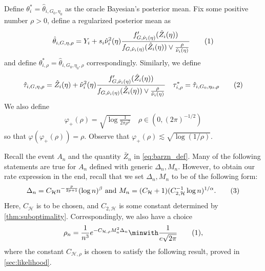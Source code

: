 \documentclass[12pt, reqno]{amsart}
\newcommand\numberthis{\addtocounter{equation}{1}\tag{\theequation}}
\newcommand{\invphi}{\varphi_{+}}
\newcommand{\Hyperparams}{\mathcal{H}}
\numberwithin{equation}{section}
\begin{document}
\begin{refsection}
\begin{appendices}
Define $\theta_i^* = \hat \theta_{i, G_0, \eta_0}$ as the oracle Bayesian's posterior
 mean. Fix some positive number $\rho > 0$, define a regularized posterior mean as \[
\hat\theta_{i, G, \eta, \rho} = Y_i + s_i \hat\nu_i^2(\eta) \frac{ f'_
{G, \hat\nu_i(\eta)}(\hat Z_i(\eta))}{f_
{G, \hat\nu_i(\eta)}(\hat Z_i(\eta)) \vee \frac{\rho}{\hat\nu_i(\eta)}} \numberthis
\label{eq:regularized_posterior_means}
\]
and define $\theta^*_{i, \rho} = \hat \theta_{i, G_0, \eta_0, \rho}$ correspondingly.
Similarly, we define \[
\hat\tau_{i, G, \eta, \rho} = \hat Z_i(\eta) + \hat\nu_i^2(\eta) \frac{ f'_
{G, \hat\nu_i(\eta)}(\hat Z_i(\eta))}{f_
{G, \hat\nu_i(\eta)}(\hat Z_i(\eta)) \vee \frac{\rho}{\hat\nu_i(\eta)}} \quad \tau^*_
{i, \rho} = \hat\tau_{i, G_0, \eta_0, \rho} \numberthis \label{eq:regularized_tau}
\]
We also define \begin{align}
\invphi(\rho) = \sqrt{\log \frac{1}{2\pi \rho^2}}
\quad \rho \in (0, (2\pi)^{-1/2}) \label{eq:invphidef}
\end{align}
so that $\varphi(\invphi(\rho))=\rho$. Observe that $\invphi(\rho) \lesssim
\sqrt{\log (1/\rho)}$. 


Recall the event $A_n$ and the quantity $\bar Z_n$ in
\eqref{eq:barzn_def}. Many of the following statements are true for $A_n$ defined with
generic $\Delta_n, M_n$. However, to obtain our rate expression in the end, recall that we
set $\Delta_n, M_n$ to be of the following form:
\[\Delta_n = C_
{\Hyperparams} n^
{-
\frac{p}{2p+1}} (\log
n)^{\beta} \text{ and } M_n =
(C_\Hyperparams + 1) (C_{2,\Hyperparams}^{-1}\log n)^{1/\alpha}.\numberthis \label{eq:DMrate}\]
Here, $C_\Hyperparams$ is to be chosen, and $C_{2, \Hyperparams}$ is some constant
determined by \cref{thm:suboptimality}. Correspondingly, we also have a choice 
\[
\rho_n =
\frac{1}{n^3} e^{-C_{\Hyperparams,\rho} M_n^2 \Delta_n}\minwith \frac{1}{e\sqrt{2\pi}}
\numberthis
\label{eq:rhodef}
,\]
where the constant $C_{\Hyperparams,\rho}$ is chosen to satisfy the following result, proved in
\cref{sec:likelihood}.


\end{appendices}
\end{refsection}
\end{document}
